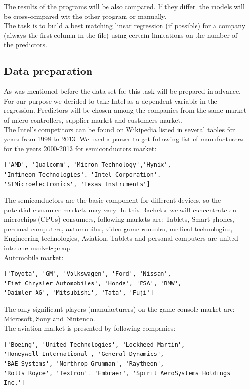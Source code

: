 \documentclass{article}
\begin{document}
The results of the programs will be also compared. If they differ, the models will be cross-compared wit the other program or manually.\\
The task is to build a best matching linear regression (if possible) for a company (always the first column in the file) using certain limitations on the number of the predictors.

\subsection{Data preparation}
As was mentioned before the data set for this task will be prepared in advance. For our purpose we decided to take Intel as a dependent variable in the regression. Predictors will be chosen among the companies from the same market of micro controllers, supplier market and customers market.\\
The Intel's competitors can be found on Wikipedia listed in several tables for years from 1998 to 2013. We used a parser to get following list of manufacturers for the years 2000-2013 for semiconductors market:
\begin{verbatim}
['AMD', 'Qualcomm', 'Micron Technology','Hynix',
'Infineon Technologies', 'Intel Corporation', 
'STMicroelectronics', 'Texas Instruments']
\end{verbatim}
The semiconductors are the basic component for different devices, so the potential consumer-markets may vary. In this Bachelor we will concentrate on microchips (CPUs) consumers, following markets are: Tablets, Smart-phones, personal computers, automobiles, video game consoles, medical technologies, Engineering technologies, Aviation. Tablets and personal computers are united into one market-group.\\
Automobile market:
\begin{verbatim}
['Toyota', 'GM', 'Volkswagen', 'Ford', 'Nissan', 
'Fiat Chrysler Automobiles', 'Honda', 'PSA', 'BMW',
'Daimler AG', 'Mitsubishi', 'Tata', 'Fuji']
\end{verbatim}
The only significant players (manufacturers) on the game console market are: Microsoft, Sony and Nintendo.\\ 
The aviation market is presented by following companies: 
\begin{verbatim}
['Boeing', 'United Technologies', 'Lockheed Martin',
'Honeywell International', 'General Dynamics',
'BAE Systems', 'Northrop Grumman', 'Raytheon',
'Rolls Royce', 'Textron', 'Embraer', 'Spirit AeroSystems Holdings Inc.']
\end{verbatim}
\end{document}
